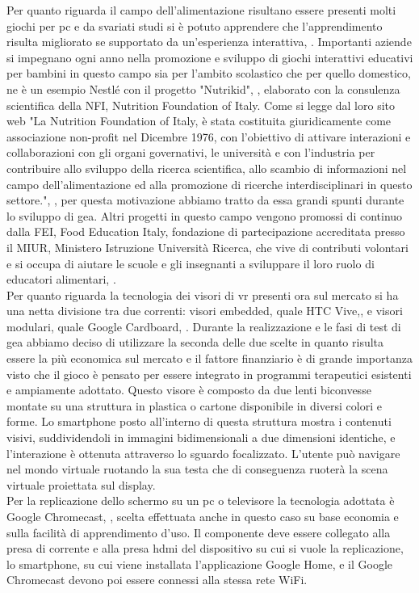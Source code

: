 Per quanto riguarda il campo dell'alimentazione risultano essere presenti molti giochi per pc e da svariati studi si è potuto apprendere che l'apprendimento risulta migliorato se supportato da un'esperienza interattiva, \cite{rif8}. Importanti aziende si impegnano ogni anno nella promozione e sviluppo di giochi interattivi educativi per bambini in questo campo sia per l'ambito scolastico che per quello domestico, ne è un esempio Nestlé con il progetto "Nutrikid", \cite{rif17}, elaborato con la consulenza scientifica della NFI, Nutrition Foundation of Italy. Come si legge dal loro sito web "La Nutrition Foundation of Italy, è stata costituita giuridicamente come associazione non-profit nel Dicembre 1976, con l'obiettivo di attivare interazioni e collaborazioni con gli organi governativi, le università e con l'industria per contribuire allo sviluppo della ricerca scientifica, allo scambio di informazioni nel campo dell'alimentazione ed alla promozione di ricerche interdisciplinari in questo settore.", \cite{rif18}, per questa motivazione abbiamo tratto da essa grandi spunti durante lo sviluppo di \acs{gea}. Altri progetti in questo campo vengono promossi di continuo dalla FEI, Food Education Italy, fondazione di partecipazione accreditata presso il MIUR, Ministero Istruzione Università Ricerca, che vive di contributi volontari e si occupa di aiutare le scuole e gli insegnanti a sviluppare il loro ruolo di educatori alimentari, \cite{rif19}.\\
Per quanto riguarda la tecnologia dei visori di \acl{vr} presenti ora sul mercato si ha una netta divisione tra due correnti: visori embedded, quale HTC Vive,\cite{rif15}, e visori modulari, quale Google Cardboard, \cite{rif9}. Durante la realizzazione e le fasi di test di \acs{gea} abbiamo deciso di utilizzare la seconda delle due scelte in quanto risulta essere la più economica sul mercato e il fattore finanziario è di grande importanza visto che il gioco è pensato per essere integrato in programmi terapeutici esistenti e ampiamente adottato. Questo visore è composto da due lenti biconvesse montate su una struttura in plastica o cartone disponibile in diversi colori e forme. Lo smartphone posto all'interno di questa struttura mostra i contenuti visivi, suddividendoli in immagini bidimensionali a due dimensioni identiche, e l'interazione è ottenuta attraverso lo sguardo focalizzato. L'utente può navigare nel mondo virtuale ruotando la sua testa che di conseguenza ruoterà la scena virtuale proiettata sul display.\\
Per la replicazione dello schermo su un pc o televisore la tecnologia adottata è Google Chromecast, \cite{rif10}, scelta effettuata anche in questo caso su base economia e sulla facilità di apprendimento d'uso. Il componente deve essere collegato alla presa di corrente e alla presa \acs{hdmi} del dispositivo su cui si vuole la replicazione, lo smartphone, su cui viene installata l'applicazione Google Home, e il Google Chromecast devono poi essere connessi alla stessa rete WiFi.